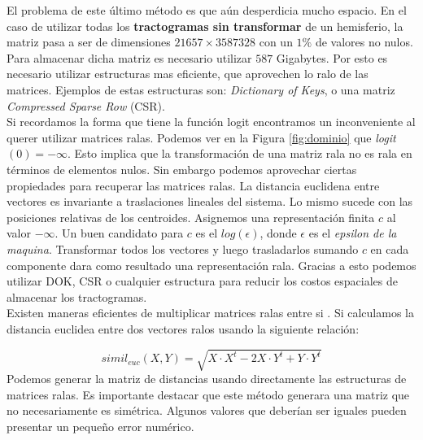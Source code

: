 El problema de este \'ultimo m\'etodo es que a\'un desperdicia mucho espacio. En
el caso de utilizar todas los \textbf{tractogramas sin transformar} de un 
hemisferio, la matriz pasa a ser de dimensiones $21657\times3587328$ con un $1\%$
de valores no nulos. Para almacenar dicha matriz es necesario utilizar $587$ 
Gigabytes. Por esto es necesario utilizar estructuras mas eficiente, que aprovechen
lo ralo de las matrices. Ejemplos de estas estructuras son: \textit{Dictionary of
Keys}, o una matriz \textit{Compressed Sparse Row} (CSR). \\


Si recordamos la forma que tiene la funci\'on logit encontramos un inconveniente
al querer utilizar matrices ralas. Podemos ver en la Figura \ref{fig:dominio} que
\textit{logit}$(0) = -\infty$. Esto implica que la transformaci\'on de una matriz
rala no es rala en t\'erminos de elementos nulos. Sin embargo podemos aprovechar
ciertas propiedades para recuperar las matrices ralas. La distancia euclidena 
entre vectores es invariante a traslaciones lineales del sistema. Lo mismo sucede
con las posiciones relativas de los centroides. Asignemos una representaci\'on 
finita $c$ al valor $-\infty$. Un buen candidato para $c$ es el $log(\epsilon)$,
donde $\epsilon$ es el \textit{epsilon de la maquina}. Transformar todos los vectores
y luego trasladarlos sumando $c$ en cada componente dara como resultado una
representaci\'on rala. Gracias a esto podemos utilizar DOK, CSR o cualquier
estructura para reducir los costos espaciales de almacenar los tractogramas. \\

Existen maneras eficientes de multiplicar matrices ralas entre si \cite{Bank1993}.
Si calculamos la distancia euclidea entre dos vectores ralos usando la siguiente
relaci\'on: 

\begin{equation}
\label{eq:simileuc}
simil_{euc}(X,Y) = \sqrt{X \cdot X^t - 2 X \cdot Y^t + Y \cdot Y^t} 
\end{equation}
Podemos generar la matriz de distancias usando directamente las estructuras de 
matrices ralas. Es importante destacar que este m\'etodo generara una matriz que no 
necesariamente es sim\'etrica. Algunos valores que deber\'ian ser iguales pueden
presentar un peque\~no error num\'erico.
